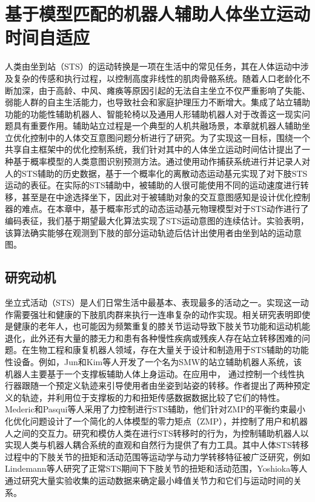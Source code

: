 \chapter{基于模型匹配的机器人辅助人体坐立运动时间自适应}
人类由坐到站（STS）的运动转换是一项在生活中的常见任务，其在人体运动中涉及复杂的传感和执行过程，以控制高度非线性的肌肉骨骼系统。随着人口老龄化不断加深，由于高龄、中风、瘫痪等原因引起的无法自主坐立不仅严重影响了失能、弱能人群的自主生活能力，也导致社会和家庭护理压力不断增大。集成了站立辅助功能的功能性辅助机器人、智能轮椅以及通用人形辅助机器人对于改善这一现实问题具有重要作用。辅助站立过程是一个典型的人机共融场景，本章就机器人辅助坐立优化控制中的人体交互意图问题分析进行了研究。为了实现这一目标，围绕一个共享自主框架中的优化控制系统，我们针对其中的人体坐立运动时间估计提出了一种基于概率模型的人类意图识别预测方法。通过使用动作捕获系统进行并记录人对人的STS辅助的历史数据，基于一个概率化的离散动态运动基元实现了对下肢STS运动的表征。在实际的STS辅助中，被辅助的人很可能使用不同的运动速度进行转移，甚至是在中途选择坐下，因此对于被辅助对象的交互意图感知是设计优化控制器的难点。在本章中，基于概率形式的动态运动基元物理模型对于STS动作进行了编码表征，我们基于期望最大化算法实现了STS运动意图的连续估计。实验表明，该算法确实能够在观测到下肢的部分运动轨迹后估计出使用者由坐到站的运动意图。
\section{研究动机}    
坐立式活动（STS）是人们日常生活中最基本、表现最多的活动之一。实现这一动作需要强壮和健康的下肢肌肉群来执行一连串复杂的动作实现。相关研究表明即使是健康的老年人，也可能因为频繁重复的膝关节运动导致下肢关节功能和运动机能退化\cite{heidariKneeOsteoarthritisPrevalence2011}，此外还有大量的膝无力和患有各种慢性疾病或残疾人存在站立转移困难的问题。在生物工程和康复机器人领域，存在大量关于设计和制造用于STS辅助的功能性设备。例如，Jun和Kim等人\cite{hong-guljunWalkingSittostandSupport2011,inhokimKinematicAnalysisSittostand2011}开发了一个名为SMW的站立辅助机器人系统，该机器人主要基于一个支撑板辅助人体上身运动。在应用中， 通过控制一个线性执行器跟随一个预定义轨迹来引导使用者由坐姿到站姿的转移。作者提出了两种预定义的轨迹，并利用位于支撑板的力和扭矩传感数据数据比较了它们的特性。Mederic和Pasqui等人\cite{medericElderlyPeopleSit2006}采用了力控制进行STS辅助，他们针对ZMP的平衡约束最小化优化问题设计了一个简化的人体模型的零力矩点（ZMP），并控制了用户和机器人之间的交互力。研究和模仿人类在进行STS转移时的行为，为控制辅助机器人以实现人类与机器人耦合系统的直观和自然行为提供了有力工具。其中人体STS转移过程中的下肢关节的扭矩和活动范围等运动学与动力学转移特征被广泛研究，例如Lindemann等人\cite{galliQuantitativeAnalysisSit2008}研究了正常STS期间下下肢关节的扭矩和活动范围，Yoshioka等人\cite{yoshiokaBiomechanicalAnalysisRelation2009}通过研究大量实验收集的运动数据来确定最小峰值关节力和它们与运动时间的关系。

